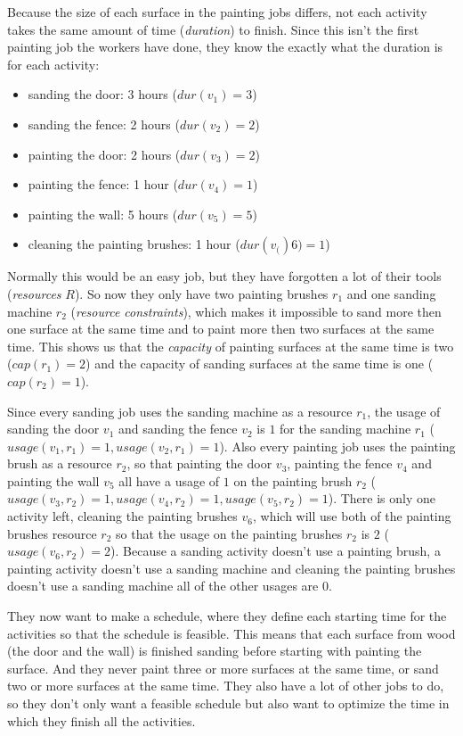 \documentclass{article}
\newcommand{\capa}[1]{\ensuremath{cap(r_{#1})}} %
\newcommand{\dur}[1]{\ensuremath{dur(v_{#1})}} %
\newcommand{\usage}[2]{\ensuremath{usage(v_{#1}, r_{#2})}} %
\begin{document}
Because the size of each surface in the painting jobs differs, not each activity takes the same amount of time (\emph{duration}) to finish.
Since this isn't the first painting job the workers have done, they know the exactly what the duration is for each activity:
\begin{itemize}
\item sanding the door: 3 hours ($\dur{1} = 3$)
\item sanding the fence: 2 hours ($\dur{2} = 2$)
\item painting the door: 2 hours ($\dur{3} = 2$)
\item painting the fence: 1 hour ($\dur{4} = 1$)
\item painting the wall: 5 hours ($\dur{5} = 5$)
\item cleaning the painting brushes: 1 hour ($\dur(6) = 1$)
\end{itemize}
Normally this would be an easy job, but they have forgotten a lot of their tools (\emph{resources} $R$).
So now they only have two painting brushes $r_1$ and one sanding machine $r_2$ (\emph{resource constraints}), which makes it impossible to sand more then one surface at the same time and to paint more then two surfaces at the same time.
This shows us that the \emph{capacity} of painting surfaces at the same time is two ($\capa{1} = 2$) and the capacity of sanding surfaces at the same time is one  ($\capa{2} = 1$).

Since every sanding job uses the sanding machine as a resource $r_1$, the usage of sanding the door $v_1$ and sanding the fence $v_2$ is $1$ for the sanding machine $r_1$ ($\usage{1}{1} = 1, \usage{2}{1} = 1$).
Also every painting job uses the painting brush as a resource $r_2$, so that painting the door $v_3$, painting the fence $v_4$ and painting the wall $v_5$ all have a usage of $1$ on the painting brush $r_2$ ($\usage{3}{2} = 1, \usage{4}{2} = 1, \usage{5}{2} = 1$).
There is only one activity left, cleaning the painting brushes $v_6$, which will use both of the painting brushes resource $r_2$ so that the usage on the painting brushes $r_2$ is $2$ ($\usage{6}{2} = 2$).
Because a sanding activity doesn't use a painting brush, a painting activity doesn't use a sanding machine and cleaning the painting brushes doesn't use a sanding machine all of the other usages are $0$.

They now want to make a schedule, where they define each starting time for the activities so that the schedule is feasible.
This means that each surface from wood (the door and the wall) is finished sanding before starting with painting the surface.
And they never paint three or more surfaces at the same time, or sand two or more surfaces at the same time.
They also have a lot of other jobs to do, so they don't only want a feasible schedule but also want to optimize the time in which they finish all the activities.
\end{document}
